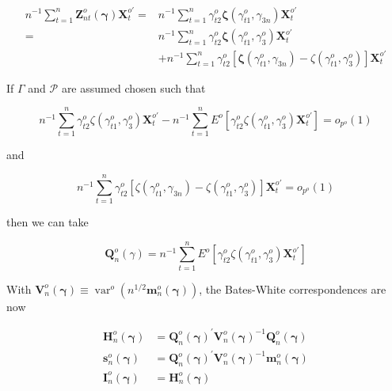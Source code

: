 \documentclass[10pt]{article}
\begin{document}
$$
\begin{aligned}
n^{-1} \sum_{t=1}^{n} \mathbf{Z}_{n t}^{o}(\boldsymbol{\gamma}) \mathbf{X}_{t}^{o \prime}= & n^{-1} \sum_{t=1}^{n} \gamma_{t 2}^{o} \boldsymbol{\zeta}\left(\gamma_{t 1}^{o}, \gamma_{3 n}\right) \mathbf{X}_{t}^{o \prime} \\
= & n^{-1} \sum_{t=1}^{n} \gamma_{t 2}^{o} \boldsymbol{\zeta}\left(\gamma_{t 1}^{o}, \gamma_{3}^{o}\right) \mathbf{X}_{t}^{o \prime} \\
& +n^{-1} \sum_{t=1}^{n} \gamma_{t 2}^{o}\left[\boldsymbol{\zeta}\left(\gamma_{t 1}^{o}, \gamma_{3 n}\right)-\zeta\left(\gamma_{t 1}^{o}, \gamma_{3}^{o}\right)\right] \mathbf{X}_{t}^{o \prime}
\end{aligned}
$$

If $\Gamma$ and $\mathcal{P}$ are assumed chosen such that

$$
n^{-1} \sum_{t=1}^{n} \gamma_{t 2}^{o} \zeta\left(\gamma_{t 1}^{o}, \gamma_{3}^{o}\right) \mathbf{X}_{t}^{o \prime}-n^{-1} \sum_{t=1}^{n} E^{o}\left[\gamma_{t 2}^{o} \zeta\left(\gamma_{t 1}^{o}, \gamma_{3}^{o}\right) \mathbf{X}_{t}^{o \prime}\right]=o_{p^{o}}(1)
$$

and

$$
n^{-1} \sum_{t=1}^{n} \gamma_{t 2}^{o}\left[\zeta\left(\gamma_{t 1}^{o}, \gamma_{3 n}\right)-\zeta\left(\gamma_{t 1}^{o}, \gamma_{3}^{o}\right)\right] \mathbf{X}_{t}^{o \prime}=o_{p^{o}}(1)
$$

then we can take

$$
\mathbf{Q}_{n}^{o}(\gamma)=n^{-1} \sum_{t=1}^{n} E^{o}\left[\gamma_{t 2}^{o} \zeta\left(\gamma_{t 1}^{o}, \gamma_{3}^{o}\right) \mathbf{X}_{t}^{o \prime}\right]
$$

With $\mathbf{V}_{n}^{o}(\boldsymbol{\gamma}) \equiv \operatorname{var}^{o}\left(n^{1 / 2} \mathbf{m}_{n}^{o}(\boldsymbol{\gamma})\right)$, the Bates-White correspondences are now

$$
\begin{aligned}
\mathbf{H}_{n}^{o}(\boldsymbol{\gamma}) & =\mathbf{Q}_{n}^{o}(\boldsymbol{\gamma})^{\prime} \mathbf{V}_{n}^{o}(\boldsymbol{\gamma})^{-1} \mathbf{Q}_{n}^{o}(\boldsymbol{\gamma}) \\
\mathbf{s}_{n}^{o}(\boldsymbol{\gamma}) & =\mathbf{Q}_{n}^{o}(\boldsymbol{\gamma})^{\prime} \mathbf{V}_{n}^{o}(\boldsymbol{\gamma})^{-1} \mathbf{m}_{n}^{o}(\boldsymbol{\gamma}) \\
\mathbf{I}_{n}^{o}(\boldsymbol{\gamma}) & =\mathbf{H}_{n}^{o}(\boldsymbol{\gamma})
\end{aligned}
$$
\end{document}
